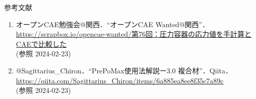 \begin{frame}{参考文献}
  \begin{enumerate}[label=\textbf{［\arabic*］},itemsep=1ex, leftmargin=1mm]
      \item オープンCAE勉強会@関西．“オープンCAE Wanted@関西”．\\
          {\footnotesize {}
          \url{https://scrapbox.io/opencae-wanted/第76回：圧力容器の応力値を手計算とCAEで比較した}} \\
          (参照 2024-02-23)
      \item @Sagittarius\_Chiron．“PrePoMax使用法解説ー3.0 複合材”．Qiita．\\
          {\footnotesize {}
          \url{https://qiita.com/Sagittarius_Chiron/items/6a885ea8ee8f35c7a89c}} \\
          (参照 2024-02-23)
  \end{enumerate}
\end{frame}
